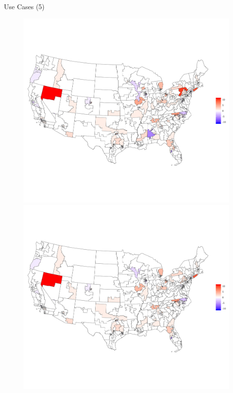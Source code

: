 \begin{frame}{Use Cases (5)}
\begin{figure}[t]
\begin{center}
	\includegraphics[scale=.17]{uc_5_map_editsanon2.png}
\hspace*{-0.1cm}
	\includegraphics[scale=.17]{uc_5_map_editsanonbefore.png}
\end{center}
\end{figure}
\end{frame}

